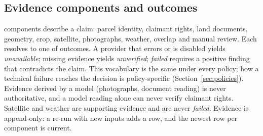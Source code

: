 \documentclass{ieeeaccess}
\begin{document}
\subsection{Evidence components and outcomes}
\PolicyComponentsCapWord{} components describe a claim: parcel identity, claimant rights, land documents, geometry, crop, satellite, photographs, weather, overlap and manual review. Each resolves to one of \PolicyOutcomesWord{} outcomes. A provider that errors or is disabled yields \emph{unavailable}; missing evidence yields \emph{unverified}; \emph{failed} requires a positive finding that contradicts the claim. This vocabulary is the same under every policy; how a technical failure reaches the decision is policy-specific (Section~\ref{sec:policies}). Evidence derived by a model (photographs, document reading) is never authoritative, and a model reading alone can never verify claimant rights. Satellite and weather are supporting evidence and are never \emph{failed}. Evidence is append-only: a re-run with new inputs adds a row, and the newest row per component is current.
\end{document}
